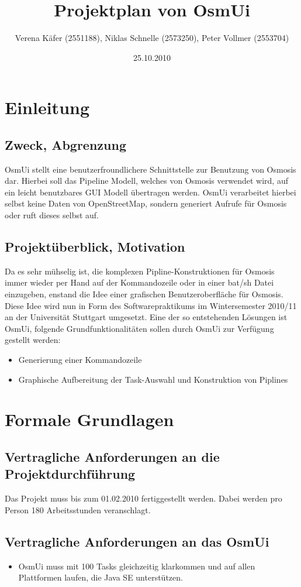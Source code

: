 \documentclass[a4paper,10pt]{scrartcl}
\author{Verena Käfer (2551188), Niklas Schnelle (2573250), Peter Vollmer (2553704)}
\date{25.10.2010}
\title{Projektplan von OsmUi}
\begin{document}
\maketitle
\newpage
\tableofcontents
\newpage


\section{Einleitung}
\subsection{Zweck, Abgrenzung}
OsmUi stellt eine benutzerfroundlichere Schnittstelle zur Benutzung von Osmosis dar. Hierbei soll das Pipeline Modell, welches von Osmosis verwendet wird, auf ein leicht benutzbares GUI Modell übertragen werden.
OsmUi verarbeitet hierbei selbst keine Daten von OpenStreetMap, sondern generiert Aufrufe für Osmosis oder ruft dieses
selbst auf. 
\subsection{Projektüberblick, Motivation}
Da es sehr mühselig ist, die komplexen Pipline-Konstruktionen für Osmosis immer wieder per Hand auf der Kommandozeile oder in einer bat/sh Datei einzugeben, 
enstand die Idee einer grafischen Benutzeroberfläche für Osmosis.
Diese Idee wird nun in Form des Softwarepraktikums im Wintersemester 2010/11 an der Universität Stuttgart umgesetzt.
Eine der so entstehenden Lösungen ist OsmUi, folgende Grundfunktionalitäten sollen durch OsmUi zur Verfügung gestellt werden:
\begin{itemize}
\item Generierung einer Kommandozeile
\item Graphische Aufbereitung der Task-Auswahl und Konstruktion von Piplines
\end{itemize}

\section{Formale Grundlagen}
\subsection{Vertragliche Anforderungen an die Projektdurchführung}
Das Projekt muss bis zum 01.02.2010 fertiggestellt werden. Dabei werden pro Person 180 Arbeitsstunden veranschlagt.
\subsection{Vertragliche Anforderungen an das OsmUi}
\begin{itemize}
\item OsmUi muss mit 100 Tasks gleichzeitig klarkommen und auf allen Plattformen laufen, die Java SE unterstützen.  
\end{itemize}
\end{document}
